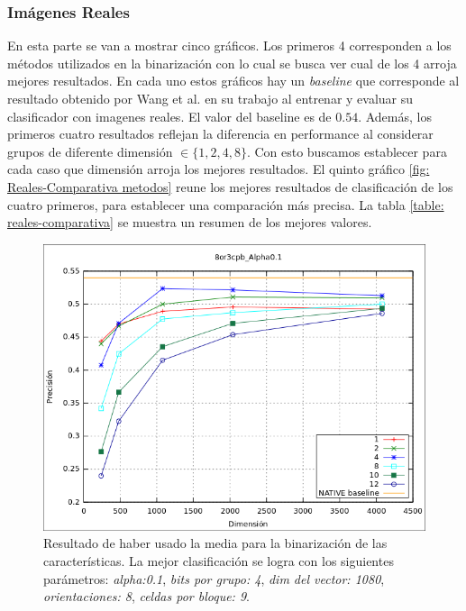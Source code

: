 	\subsubsection{Imágenes Reales}
	
	En esta parte se van a mostrar cinco gráficos. Los primeros 4 corresponden a los métodos utilizados en la binarización con lo cual se busca ver cual de los 4 arroja mejores resultados. En cada uno estos gráficos hay un \textit{baseline} que corresponde al resultado obtenido por Wang et al. en su trabajo al entrenar y evaluar su clasificador con imagenes reales. El valor del baseline es de $0.54$. Además, los primeros cuatro resultados reflejan la diferencia en performance al considerar grupos de diferente dimensión $\in \{ 1, 2, 4, 8\}$. Con esto buscamos establecer para cada caso que dimensión arroja los mejores resultados. El quinto gráfico \ref{fig: Reales-Comparativa metodos} reune los mejores resultados de clasificación de los cuatro primeros, para establecer una comparación más precisa. La tabla \ref{table: reales-comparativa} se muestra un resumen de los mejores valores.
		
			\begin{figure}[htbp!]
				\centering
				\includegraphics[scale=0.6]{img/resultados/reales/mean.png}
				\caption[Reales con umbral media]{Resultado de haber usado la media para la binarización de las características. La mejor clasificación se logra con los siguientes parámetros: \textit{alpha:0.1}, \textit{bits por grupo: 4}, \textit{dim del vector: 1080}, \textit{orientaciones: 8}, \textit{celdas por bloque: 9}.}
				\label{fig: Reales-media}
			\end{figure}
			
